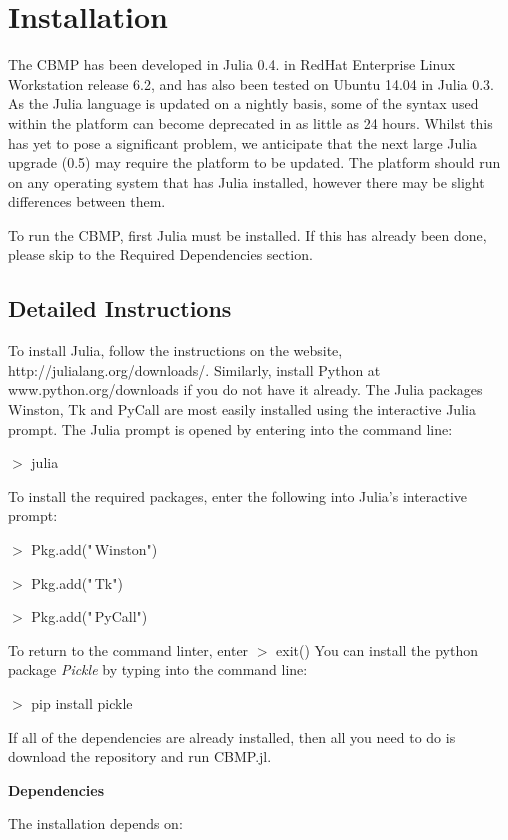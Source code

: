 \documentclass[12pt,a4paper]{report}
\begin{document}
\section{Installation}
The CBMP has been developed in Julia 0.4. in RedHat Enterprise Linux 
Workstation release 6.2, and has also been tested on Ubuntu 14.04 in 
Julia 0.3. As the Julia language is updated on a nightly basis, some of 
the syntax used within the platform can become deprecated in as little 
as 24 hours. Whilst this has yet to pose a significant problem, we 
anticipate that the next large Julia upgrade (0.5) may require the 
platform to be updated. The platform should run on any operating system 
that has Julia installed, however there may be slight differences 
between them.

To run the CBMP, first Julia must be installed. If this has already been 
done, please skip to the Required Dependencies section.

\subsection{Detailed Instructions}
To install Julia, follow the instructions on the website, 
http://julialang.org/downloads/. Similarly,
install Python at www.python.org/downloads if you do not have it already. 
The Julia packages Winston, Tk and PyCall are most easily installed 
using the interactive Julia prompt. The Julia prompt is opened by entering
into the command line:

{\fontsize{09pt}{09pt} \ttfamily 
$>$ julia}

To install the required packages, enter the following into Julia's interactive prompt:

{\fontsize{09pt}{09pt} \ttfamily 
$>$ Pkg.add("\,Winston")

$>$ Pkg.add("\,Tk")

$>$ Pkg.add("\,PyCall")}

To return to the command linter, enter
{\fontsize{09pt}{09pt} \ttfamily 
$>$ exit()}
You can install the python package {\itshape Pickle} by typing into the 
command line:

{\fontsize{09pt}{09pt} \ttfamily 
$>$ pip install pickle}

If all of the dependencies are already installed, then all you need to 
do is download the repository and run CBMP.jl.



{\bfseries Dependencies}

The installation depends on:
\end{document}
